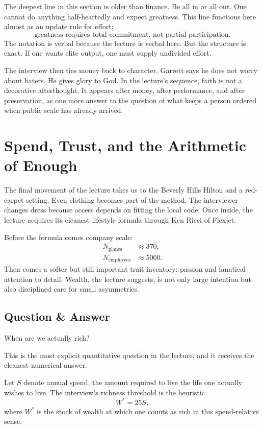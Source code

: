 The deepest line in this section is older than finance. Be all in or all out. One cannot do anything half-heartedly and expect greatness. This line functions here almost as an update rule for effort:
\begin{equation}
\text{greatness requires total commitment, not partial participation.}
\end{equation}
The notation is verbal because the lecture is verbal here. But the structure is exact. If one wants elite output, one must supply undivided effort.

The interview then ties money back to character. Garrett says he does not worry about haters. He gives glory to God. In the lecture's sequence, faith is not a decorative afterthought. It appears after money, after performance, and after preservation, as one more answer to the question of what keeps a person ordered when public scale has already arrived.

\section{Spend, Trust, and the Arithmetic of Enough}

The final movement of the lecture takes us to the Beverly Hills Hilton and a red-carpet setting. Even clothing becomes part of the method. The interviewer changes dress because access depends on fitting the local code. Once inside, the lecture acquires its cleanest lifestyle formula through Ken Ricci of Flexjet.

Before the formula comes company scale:
\begin{align}
N_{\text{planes}} &\approx 370,\\
N_{\text{employees}} &\approx 5000.
\end{align}
Then comes a softer but still important trait inventory: passion and fanatical attention to detail. Wealth, the lecture suggests, is not only large intention but also disciplined care for small asymmetries.

\subsection{Question \& Answer}

When are we actually rich?

This is the most explicit quantitative question in the lecture, and it receives the cleanest numerical answer.

\begin{definition}
Let \(S\) denote annual spend, the amount required to live the life one actually wishes to live. The interview's richness threshold is the heuristic
\begin{equation}
W^\ast = 25S,
\end{equation}
where \(W^\ast\) is the stock of wealth at which one counts as rich in this spend-relative sense.
\end{definition}

